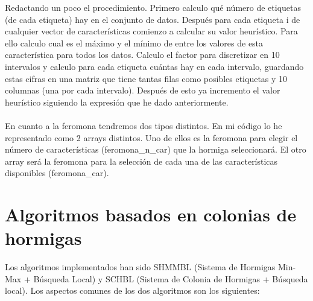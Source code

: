 Redactando un poco el procedimiento. Primero calculo qué número de etiquetas (de cada etiqueta) hay en el conjunto de datos. Después para cada etiqueta i de cualquier vector de características comienzo a calcular su valor heurístico. Para ello calculo cual es el máximo y el mínimo de entre los valores de esta característica para todos los datos. Calculo el factor para discretizar en 10 intervalos y calculo para cada etiqueta cuántas hay en cada intervalo, guardando estas cifras en una matriz que tiene tantas filas como posibles etiquetas y 10 columnas (una por cada intervalo). Después de esto ya incremento el valor heurístico siguiendo la expresión que he dado anteriormente.
\\
\\

En cuanto a la feromona tendremos dos tipos distintos. En mi código lo he representado como 2 arrays distintos. Uno de ellos es la feromona para elegir el número de características (feromona\_n\_car) que la hormiga seleccionará. El otro array será la feromona para la selección de cada una de las características disponibles (feromona\_car).

\section{Algoritmos basados en colonias de hormigas}
Los algoritmos implementados han sido SHMMBL (Sistema de Hormigas Min-Max + Búsqueda Local) y SCHBL (Sistema de Colonia de Hormigas + Búsqueda local). Los aspectos comunes de los dos algoritmos son los siguientes:

